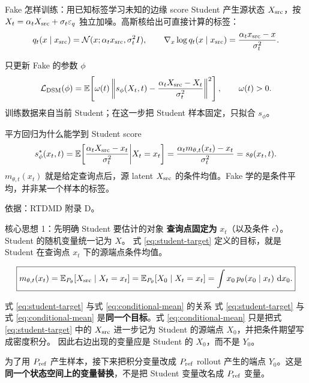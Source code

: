 \documentclass[10pt,aspectratio=169]{beamer}
\newcommand{\E}{\mathbb E}
\newcommand{\dd}{\,\mathrm d}
\newcommand{\N}{\mathcal N}
\newcommand{\sourceline}[1]{\par{\scriptsize\color{gray}#1}\par}
\begin{document}
\begin{frame}{Fake 怎样训练：用已知标签学习未知的边缘 score}
\small
Student 产生源状态 $X_{\rm src}$，按 $X_t=\alpha_tX_{\rm src}+\sigma_t\varepsilon_q$ 独立加噪。高斯核给出可直接计算的标签：
\begin{equation}\label{eq:dsm-label}
q_t(x\mid x_{\rm src})=\N(x;\alpha_tx_{\rm src},\sigma_t^2I),\qquad
\nabla_x\log q_t(x\mid x_{\rm src})=\frac{\alpha_tx_{\rm src}-x}{\sigma_t^2}.
\end{equation}
\begin{block}{只更新 Fake 的参数 $\phi$}
\begin{equation}\label{eq:fake-dsm}
\mathcal L_{\rm DSM}(\phi)=
\E\!\left[\omega(t)\left\|s_\phi(X_t,t)-
\frac{\alpha_tX_{\rm src}-X_t}{\sigma_t^2}\right\|^2\right],\qquad\omega(t)>0.
\end{equation}
训练数据来自当前 Student；在这一步把 Student 样本固定，只拟合 $s_\phi$。
\end{block}
\begin{exampleblock}{平方回归为什么能学到 Student score}
\begin{equation}\label{eq:fake-optimum}
s_\phi^*(x_t,t)=\E\!\left[\frac{\alpha_tX_{\rm src}-x_t}{\sigma_t^2}\middle|X_t=x_t\right]
=\frac{\alpha_tm_{\theta,t}(x_t)-x_t}{\sigma_t^2}=s_\theta(x_t,t).
\end{equation}
$m_{\theta,t}(x_t)$ 就是给定查询点后，源 latent $X_{\rm src}$ 的条件均值。Fake 学的是条件平均，并非某一个样本的标签。
\end{exampleblock}
\sourceline{依据：RTDMD 附录 D。}
\end{frame}

\begin{frame}{核心思想 1：先明确 Student 要估计的对象}
\small
\textbf{查询点固定为} $x_t$（以及条件 $c$）。Student 的随机变量统一记为 $X$。
式 \eqref{eq:student-target} 定义的目标，就是 Student 在查询点 $x_t$ 下的源端点条件均值。

\begin{equation}
\boxed{
m_{\theta,t}(x_t)
=
\E_{P_\theta}[X_{\rm src}\mid X_t=x_t]
=
\E_{P_\theta}[X_0\mid X_t=x_t]
=
\int x_0\,p_\theta(x_0\mid x_t)\,\dd x_0 .
}
\label{eq:conditional-mean}
\end{equation}

\begin{block}{式 \eqref{eq:student-target} 与式 \eqref{eq:conditional-mean} 的关系}
式 \eqref{eq:student-target} 与式 \eqref{eq:conditional-mean} 是\textbf{同一个目标}。式 \eqref{eq:conditional-mean} 只是把式 \eqref{eq:student-target} 中的
$X_{\rm src}$ 进一步记为 Student 的源端点 $X_0$，并把条件期望写成密度积分。
因此右边出现的变量应是 Student 的 $X_0$，而不是 $Y_0$。
\end{block}

为了用 $P_{\rm ref}$ 产生样本，接下来把积分变量改成 $P_{\rm ref}$ rollout
产生的端点 $Y_0$。这是\textbf{同一个状态空间上的变量替换}，不是把 Student
变量改名成 $P_{\rm ref}$ 变量。
\end{frame}
\end{document}
